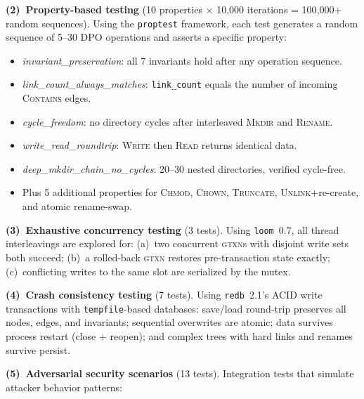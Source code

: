 \documentclass[11pt,a4paper]{article}
\theoremstyle{definition}
\newcommand{\GTXN}{\textsc{gtxn}}
\begin{document}
\textbf{(2)~Property-based testing} (10 properties $\times$ 10{,}000
iterations = 100{,}000+ random sequences).  Using the \texttt{proptest}
framework, each test generates a random sequence of 5--30 DPO operations
and asserts a specific property:

\begin{itemize}[nosep]
  \item \textit{invariant\_preservation}: all 7 invariants hold after any
        operation sequence.
  \item \textit{link\_count\_always\_matches}: \texttt{link\_count} equals the
        number of incoming \textsc{Contains} edges.
  \item \textit{cycle\_freedom}: no directory cycles after interleaved
        \textsc{Mkdir} and \textsc{Rename}.
  \item \textit{write\_read\_roundtrip}: \textsc{Write} then \textsc{Read}
        returns identical data.
  \item \textit{deep\_mkdir\_chain\_no\_cycles}: 20--30 nested directories,
        verified cycle-free.
  \item Plus 5 additional properties for \textsc{Chmod}, \textsc{Chown},
        \textsc{Truncate}, \textsc{Unlink}+re-create, and atomic rename-swap.
\end{itemize}

\textbf{(3)~Exhaustive concurrency testing} (3 tests).  Using \texttt{loom}~0.7,
all thread interleavings are explored for:
(a)~two concurrent \GTXN{}s with disjoint write sets both succeed;
(b)~a rolled-back \GTXN{} restores pre-transaction state exactly;
(c)~conflicting writes to the same slot are serialized by the mutex.

\textbf{(4)~Crash consistency testing} (7 tests).  Using \texttt{redb}~2.1's
ACID write transactions with \texttt{tempfile}-based databases:
save/load round-trip preserves all nodes, edges, and invariants;
sequential overwrites are atomic; data survives process restart (close +
reopen); and complex trees with hard links and renames survive persist.

\textbf{(5)~Adversarial security scenarios} (13 tests).  Integration tests
that simulate attacker behavior patterns:
\end{document}
